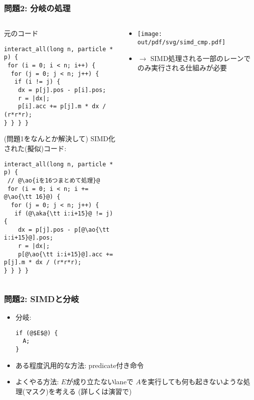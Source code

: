 \documentclass[10pt,dvipdfmx]{beamer}
\newcommand{\ao}[1]{{\color{blue}#1}}
\newcommand{\aka}[1]{{\color{red}#1}}
\begin{document}
\begin{frame}[fragile]
\frametitle{問題2: 分岐の処理}
\begin{columns}
\begin{column}{0.6\textwidth}
元のコード
\begin{lstlisting}
interact_all(long n, particle * p) {
 for (i = 0; i < n; i++) {
  for (j = 0; j < n; j++) {
   if (i != j) {
    dx = p[j].pos - p[i].pos;
    r = |dx|;
    p[i].acc += p[j].m * dx / (r*r*r);
} } } }
\end{lstlisting}

{\scriptsize (問題1をなんとか解決して)}
SIMD化された(擬似)コード:
\begin{lstlisting}
interact_all(long n, particle * p) {
 // @\ao{iを16つまとめて処理}@    
 for (i = 0; i < n; i += @\ao{\tt 16}@) {
  for (j = 0; j < n; j++) {
   if (@\aka{\tt i:i+15}@ != j) {
    dx = p[j].pos - p[@\ao{\tt i:i+15}@].pos;
    r = |dx|;
    p[@\ao{\tt i:i+15}@].acc += p[j].m * dx / (r*r*r);
} } } }
\end{lstlisting}
\end{column}

\begin{column}{0.5\textwidth}
  \begin{itemize}
  \item []
\begin{center}
  \texttt{[image: out/pdf/svg/simd\_cmp.pdf]}
\end{center}
\item $\rightarrow$
  SIMD処理される\ao{一部のレーンでのみ実行}される仕組みが必要
  \end{itemize}
\end{column}
\end{columns}
\end{frame}

\begin{frame}[fragile]
\frametitle{問題2: SIMDと分岐}
\begin{itemize}
\item 分岐:
\begin{lstlisting}
if (@$E$@) {
  A;
}
\end{lstlisting}

\item ある程度汎用的な方法: predicate付き命令
  
\item よくやる方法: $E$が成り立たないlaneで
  $A$を実行しても何も起きないような処理(マスク)を考える
  (詳しくは演習で)

\end{itemize}
\end{frame}
\end{document}
